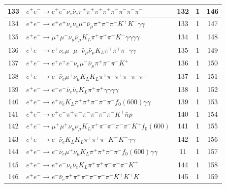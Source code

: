 \documentclass[landscape]{article}
\begin{document}
\begin{table}[htbp!]
\begin{tabular}{|c|>{\centering}p{18cm}|c|c|c|}
\hline
133 & $ e^{+} e^{-} \rightarrow e^{+} e^{-} \nu_{e} \bar{\nu}_{e} \pi^{+} \pi^{+} \pi^{+} \pi^{+} \pi^{-} \pi^{-} \pi^{-} \pi^{-} $ & 132 & 1 & 146 \\
\hline
134 & $ e^{+} e^{-} \rightarrow e^{+} e^{+} \nu_{e} \nu_{e} \mu^{-} \bar{\nu}_{\mu} \pi^{+} \pi^{-} \pi^{-} K^{+} K^{-} \gamma \gamma $ & 133 & 1 & 147 \\
\hline
135 & $ e^{+} e^{-} \rightarrow \mu^{+} \mu^{-} \nu_{\mu} \bar{\nu}_{\mu} K_{L} \pi^{+} \pi^{+} \pi^{-} K^{-} \gamma \gamma \gamma \gamma $ & 134 & 1 & 148 \\
\hline
136 & $ e^{+} e^{-} \rightarrow e^{+} \nu_{e} \mu^{-} \mu^{-} \bar{\nu}_{\mu} \bar{\nu}_{\mu} K_{L} \pi^{+} \pi^{+} \pi^{-} \gamma \gamma $ & 135 & 1 & 149 \\
\hline
137 & $ e^{+} e^{-} \rightarrow e^{+} e^{+} e^{-} \nu_{e} \mu^{-} \bar{\nu}_{\mu} \pi^{+} \pi^{-} \pi^{-} K^{+} $ & 136 & 1 & 150 \\
\hline
138 & $ e^{+} e^{-} \rightarrow e^{-} \bar{\nu}_{e} \mu^{+} \nu_{\mu} K_{L} K_{L} \pi^{+} \pi^{+} \pi^{+} \pi^{-} \pi^{-} \pi^{-} $ & 137 & 1 & 151 \\
\hline
139 & $ e^{+} e^{-} \rightarrow e^{-} e^{-} \bar{\nu}_{e} \bar{\nu}_{e} K_{L} \pi^{+} \pi^{+} \gamma \gamma \gamma \gamma $ & 138 & 1 & 152 \\
\hline
140 & $ e^{+} e^{-} \rightarrow e^{+} \nu_{e} K_{L} \pi^{+} \pi^{+} \pi^{-} \pi^{-} \pi^{-} f_{0}(600) \gamma \gamma $ & 139 & 1 & 153 \\
\hline
141 & $ e^{+} e^{-} \rightarrow e^{+} e^{-} \pi^{+} \pi^{+} \pi^{-} \pi^{-} \pi^{-} \pi^{-} K^{+} \bar{n} p $ & 140 & 1 & 154 \\
\hline
142 & $ e^{+} e^{-} \rightarrow \mu^{+} \mu^{+} \nu_{\mu} \nu_{\mu} K_{L} \pi^{+} \pi^{-} \pi^{-} \pi^{-} \pi^{-} K^{+} f_{0}(600) $ & 141 & 1 & 155 \\
\hline
143 & $ e^{+} e^{-} \rightarrow e^{-} \bar{\nu}_{e} K_{L} K_{L} \pi^{+} \pi^{+} \pi^{-} K^{+} K^{-} \gamma \gamma $ & 142 & 1 & 156 \\
\hline
144 & $ e^{+} e^{-} \rightarrow e^{-} \bar{\nu}_{e} \mu^{+} \nu_{\mu} K_{L} \pi^{+} \pi^{+} \pi^{-} \pi^{-} f_{0}(600) \gamma \gamma $ & 11 & 1 & 157 \\
\hline
145 & $ e^{+} e^{-} \rightarrow e^{+} e^{-} \nu_{e} \bar{\nu}_{e} K_{L} \pi^{+} \pi^{+} \pi^{-} \pi^{-} \pi^{-} K^{+} $ & 144 & 1 & 158 \\
\hline
146 & $ e^{+} e^{-} \rightarrow e^{-} \bar{\nu}_{e} \pi^{+} \pi^{+} \pi^{+} \pi^{-} \pi^{-} \pi^{-} K^{+} K^{+} K^{-} $ & 145 & 1 & 159 \\

\end{tabular}
\end{table}
\end{document}
